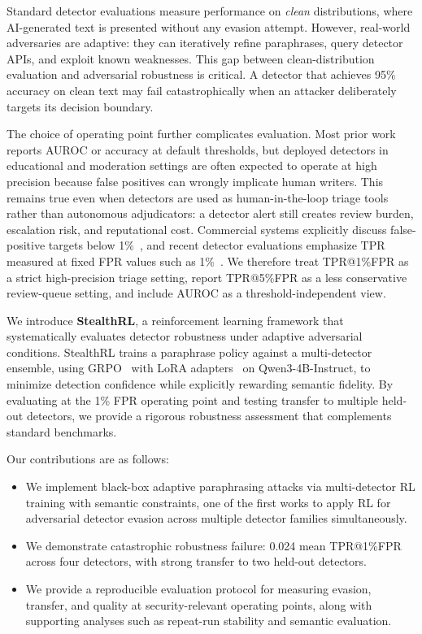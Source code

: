 \documentclass[11pt]{article}
\begin{document}
Standard detector evaluations measure performance on \emph{clean} distributions, where AI-generated text is presented without any evasion attempt. However, real-world adversaries are adaptive: they can iteratively refine paraphrases, query detector APIs, and exploit known weaknesses. This gap between clean-distribution evaluation and adversarial robustness is critical. A detector that achieves 95\% accuracy on clean text may fail catastrophically when an attacker deliberately targets its decision boundary.

The choice of operating point further complicates evaluation. Most prior work reports AUROC or accuracy at default thresholds, but deployed detectors in educational and moderation settings are often expected to operate at high precision because false positives can wrongly implicate human writers. This remains true even when detectors are used as human-in-the-loop triage tools rather than autonomous adjudicators: a detector alert still creates review burden, escalation risk, and reputational cost. Commercial systems explicitly discuss false-positive targets below 1\%~\cite{turnitin2023falsepositives}, and recent detector evaluations emphasize TPR measured at fixed FPR values such as 1\%~\cite{tufts-etal-2025-practical}. We therefore treat TPR@1\%FPR as a strict high-precision triage setting, report TPR@5\%FPR as a less conservative review-queue setting, and include AUROC as a threshold-independent view.

We introduce \textbf{StealthRL}, a reinforcement learning framework that systematically evaluates detector robustness under adaptive adversarial conditions. StealthRL trains a paraphrase policy against a multi-detector ensemble, using GRPO~\cite{pang2025grpo} with LoRA adapters~\cite{hu2021loralowrankadaptationlarge} on Qwen3-4B-Instruct, to minimize detection confidence while explicitly rewarding semantic fidelity. By evaluating at the 1\% FPR operating point and testing transfer to multiple held-out detectors, we provide a rigorous robustness assessment that complements standard benchmarks.

Our contributions are as follows:
\begin{itemize}[leftmargin=*,itemsep=2pt]
  \item We implement black-box adaptive paraphrasing attacks via multi-detector RL training with semantic constraints, one of the first works to apply RL for adversarial detector evasion across multiple detector families simultaneously.
  \item We demonstrate catastrophic robustness failure: 0.024 mean TPR@1\%FPR across four detectors, with strong transfer to two held-out detectors.
  \item We provide a reproducible evaluation protocol for measuring evasion, transfer, and quality at security-relevant operating points, along with supporting analyses such as repeat-run stability and semantic evaluation.
\end{itemize}
\end{document}
